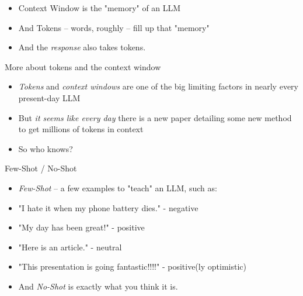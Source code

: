 \documentclass{beamer}
\begin{document}
\begin{frame}
	\begin{itemize}
		\item Context Window is the "memory" of an LLM
		\pause
		\item And Tokens -- words, roughly -- fill up that "memory"
		\pause
		\item And the \textit{response} also takes tokens.
	\end{itemize}
\end{frame}


\begin{frame}[plain]
\end{frame}

\begin{frame}{More about tokens and the context window}
	\begin{itemize}
		\item \textit{Tokens} and \textit{context windows} are one of the big limiting factors in nearly every present-day LLM
		\pause
		\item But \textit{it seems like every day} there is a new paper detailing some new method to get millions of tokens in context
		\pause
		\item So who knows?
	\end{itemize}
	
\end{frame}

\begin{frame}{Few-Shot / No-Shot}
	\begin{itemize}
		\item \textit{Few-Shot} -- a few examples to "teach" an LLM, such as:
		\pause
		\item "I hate it when my phone battery dies." - negative
		\pause
		\item "My day has been great!" - positive
		\pause
		\item "Here is an article." - neutral
		\pause
		\item "This presentation is going fantastic!!!!" - positive(ly optimistic)
		\pause
		\item And \textit{No-Shot} is exactly what you think it is.
	\end{itemize}
\end{frame}
\end{document}
